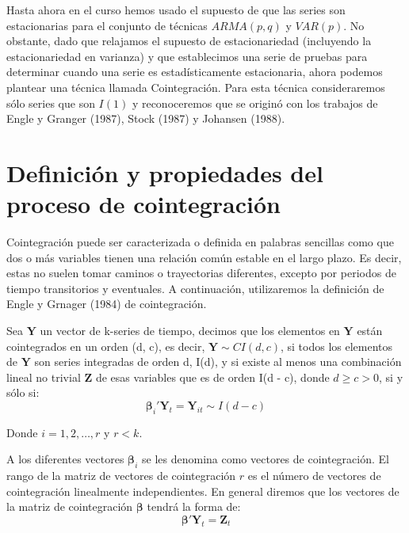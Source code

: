 \documentclass[
]{book}
\begin{document}
Hasta ahora en el curso hemos usado el supuesto de que las series son estacionarias para el conjunto de técnicas \(ARMA(p,q)\) y \(VAR(p)\). No obstante, dado que relajamos el supuesto de estacionariedad (incluyendo la estacionariedad en varianza) y que establecimos una serie de pruebas para determinar cuando una serie es estadísticamente estacionaria, ahora podemos plantear una técnica llamada Cointegración. Para esta técnica consideraremos sólo series que son \(I(1)\) y reconoceremos que se originó con los trabajos de Engle y Granger (1987), Stock (1987) y Johansen (1988).

\hypertarget{definiciuxf3n-y-propiedades-del-proceso-de-cointegraciuxf3n}{%
\section{Definición y propiedades del proceso de cointegración}\label{definiciuxf3n-y-propiedades-del-proceso-de-cointegraciuxf3n}}

Cointegración puede ser caracterizada o definida en palabras sencillas como que dos o más variables tienen una relación común estable en el largo plazo. Es decir, estas no suelen tomar caminos o trayectorias diferentes, excepto por periodos de tiempo transitorios y eventuales. A continuación, utilizaremos la definición de Engle y Grnager (1984) de cointegración.

Sea \(\mathbf{Y}\) un vector de k-series de tiempo, decimos que los elementos en \(\mathbf{Y}\) están cointegrados en un orden (d, c), es decir, \(\mathbf{Y} \sim CI(d, c)\), si todos los elementos de \(\mathbf{Y}\) son series integradas de orden d, I(d), y si existe al menos una combinación lineal no trivial \(\mathbf{Z}\) de esas variables que es de orden I(d - c), donde \(d \geq c > 0\), si y sólo si:
\begin{equation}
    \boldsymbol{\beta}_i' \mathbf{Y}_t = \mathbf{Y}_{it} \sim I(d-c)
\end{equation}

Donde \(i = 1, 2, \ldots, r\) y \(r < k\).

A los diferentes vectores \(\boldsymbol{\beta}_i\) se les denomina como vectores de cointegración. El rango de la matriz de vectores de cointegración \(r\) es el número de vectores de cointegración linealmente independientes. En general diremos que los vectores de la matriz de cointegración \(\boldsymbol{\beta}\) tendrá la forma de:
\begin{equation}
    \boldsymbol{\beta}' \mathbf{Y}_t = \mathbf{Z}_t
\end{equation}
\end{document}
